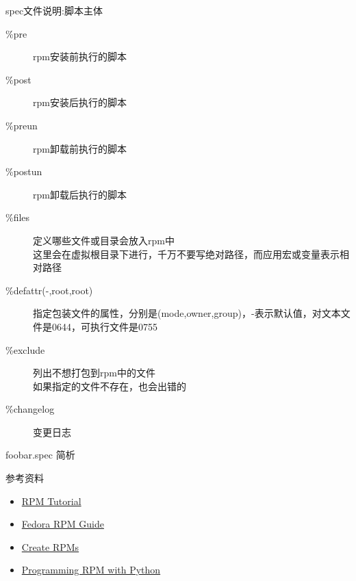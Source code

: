 \begin{frame}[allowframebreaks]{spec文件说明:脚本主体 }
\begin{description}
\item[\%pre] rpm安装前执行的脚本
\item[\%post] rpm安装后执行的脚本

\item[\%preun] rpm卸载前执行的脚本

\item[\%postun] rpm卸载后执行的脚本

\item[\%files] 定义哪些文件或目录会放入rpm中 \\
\alert{这里会在虚拟根目录下进行，千万不要写绝对路径，而应用宏或变量表示相对路径}
\item[\%defattr(-,root,root)] 指定包装文件的属性，分别是(mode,owner,group)，-表示默认值，对文本文件是0644，可执行文件是0755

\item[\%exclude] 列出不想打包到rpm中的文件 \\
\alert{如果指定的文件不存在，也会出错的} 
\item[\%changelog] 变更日志
\end{description}
\end{frame}


\begin{frame}[allowframebreaks]{foobar.spec 简析}

\end{frame}

\begin{frame}{参考资料}
\begin{itemize}
\item \href{http://fedoranews.org/alex/tutorial/rpm/}{RPM Tutorial}
\item \href{http://docs.fedoraproject.org/en-US/Fedora_Draft_Documentation/0.1/html/RPM_Guide/index.html}{Fedora RPM Guide}
\item \href{http://www.gurulabs.com/GURULABS-RPM-LAB/GURULABS-RPM-GUIDE-v1.0.PDF}{Create RPMs}
\item \href{http://docs.fedoraproject.org/en-US/Fedora_Draft_Documentation/0.1/html/RPM_Guide/ch-rpm-programming-python.html} {Programming RPM with Python} 
\end{itemize}
\end{frame}

